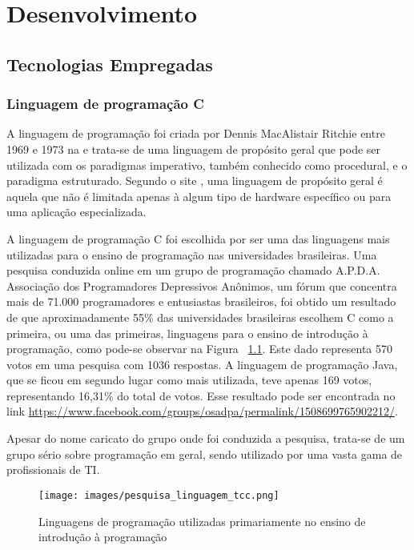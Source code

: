 \documentclass[12pt, %
openright,
oneside, %
a4paper,    %
brazil]{facom-ufu-abntex2}
\begin{document}
\chapter{Desenvolvimento}

\section{Tecnologias Empregadas}

\subsection{Linguagem de programação C}
A linguagem de programação  foi criada por Dennis MacAlistair Ritchie entre 1969 e 1973 na  e trata-se de uma linguagem de propósito geral que pode ser utilizada com os paradigmas imperativo, também conhecido como procedural, e o paradigma estruturado. Segundo o site , uma linguagem de propósito geral é aquela que não é limitada apenas à algum tipo de hardware específico ou para uma aplicação especializada.

A linguagem de programação C foi escolhida por ser uma das linguagens mais utilizadas para o ensino de programação nas universidades brasileiras. Uma pesquisa conduzida online em um grupo de programação chamado A.P.D.A. Associação dos Programadores Depressivos Anônimos, um fórum que concentra mais de 71.000 programadores e entusiastas brasileiros, foi obtido um resultado de que aproximadamente 55\% das universidades brasileiras escolhem C como a primeira, ou uma das primeiras, linguagens para o ensino de introdução à programação, como pode-se observar na Figura ~\ref{fig:pesquisa_linguagem_tcc}. Este dado representa 570 votos em uma pesquisa com 1036 respostas. A linguagem de programação Java, que se ficou em segundo lugar como mais utilizada, teve apenas 169 votos, representando 16,31\% do total de votos. Esse resultado pode ser encontrada no link \url{https://www.facebook.com/groups/osadpa/permalink/1508699765902212/}.

Apesar do nome caricato do grupo onde foi conduzida a pesquisa, trata-se de um grupo sério sobre programação em geral, sendo utilizado por uma vasta gama de profissionais de TI.

\pagebreak
\begin{figure}[htbp]
  \centering
  \texttt{[image: images/pesquisa\_linguagem\_tcc.png]}
  \caption{Linguagens de programação utilizadas primariamente no ensino de introdução à programação}
  \label{fig:pesquisa_linguagem_tcc}
\end{figure}
\end{document}
